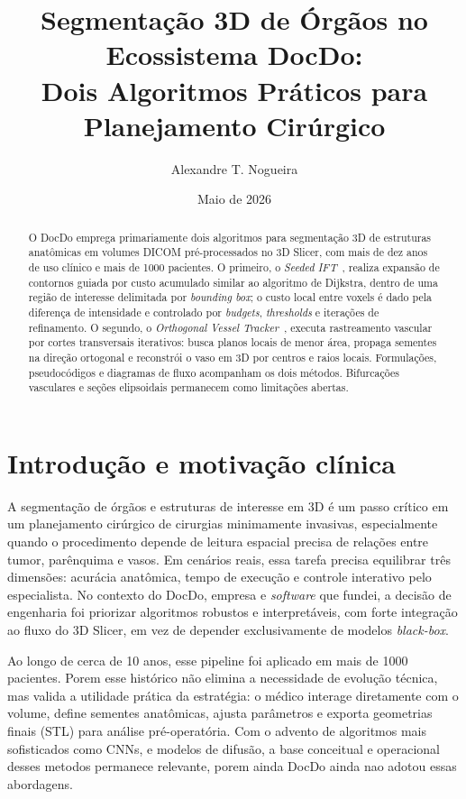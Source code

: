 \documentclass[12pt,a4paper]{article}
\title{Segmentação 3D de Órgãos no Ecossistema DocDo:\\
Dois Algoritmos Práticos para Planejamento Cirúrgico}
\author{Alexandre T. Nogueira}
\date{Maio de 2026}
\begin{document}
\maketitle

\begin{abstract}
O DocDo emprega primariamente dois algoritmos para segmentação 3D de estruturas anatômicas em volumes DICOM pré-processados no 3D Slicer, com mais de dez anos de uso clínico e mais de 1000 pacientes. O primeiro, o \textit{Seeded IFT}~\cite{falcao2004}, realiza expansão de contornos guiada por custo acumulado similar ao algoritmo de Dijkstra, dentro de uma região de interesse delimitada por \textit{bounding box}; o custo local entre voxels é dado pela diferença de intensidade e controlado por \textit{budgets}, \textit{thresholds} e iterações de refinamento. O segundo, o \textit{Orthogonal Vessel Tracker}~\cite{aylward2002}, executa rastreamento vascular por cortes transversais iterativos: busca planos locais de menor área, propaga sementes na direção ortogonal e reconstrói o vaso em 3D por centros e raios locais. Formulações, pseudocódigos e diagramas de fluxo acompanham os dois métodos. Bifurcações vasculares e seções elipsoidais permanecem como limitações abertas.
\end{abstract}

\section{Introdução e motivação clínica}

A segmentação de órgãos e estruturas de interesse em 3D é um passo crítico em um planejamento cirúrgico de cirurgias minimamente invasivas, especialmente quando o procedimento depende de leitura espacial precisa de relações entre tumor, parênquima e vasos. Em cenários reais, essa tarefa precisa equilibrar três dimensões: acurácia anatômica, tempo de execução e controle interativo pelo especialista. No contexto do DocDo, empresa e \textit{software} que fundei, a decisão de engenharia foi priorizar algoritmos robustos e interpretáveis, com forte integração ao fluxo do 3D Slicer, em vez de depender exclusivamente de modelos \textit{black-box}.

Ao longo de cerca de 10 anos, esse pipeline foi aplicado em mais de 1000 pacientes. Porem esse histórico não elimina a necessidade de evolução técnica, mas valida a utilidade prática da estratégia: o médico interage diretamente com o volume, define sementes anatômicas, ajusta parâmetros e exporta geometrias finais (STL) para análise pré-operatória. Com o advento de algoritmos mais sofisticados como CNNs, e modelos de difusão, a base conceitual e operacional desses metodos permanece relevante, porem ainda DocDo ainda nao adotou essas abordagens.
\end{document}
